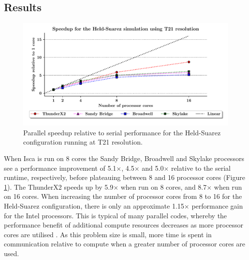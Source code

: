 \documentclass[a4paper,11pt]{report}
\begin{document}
\subsection{Results}
\begin{figure}[htbp]
\begin{center}
\includegraphics[width=1\textwidth]{img/speedup-T21-Held_suarez.pdf}
\caption[Speedup of the Held-Suarez configuration at T21 resolution]{Parallel speedup relative to serial performance for the Held-Suarez configuration running at T21 resolution.}
\label{fig:t21-scale}
\end{center}
\end{figure}
\par
When Isca is run on 8 cores the Sandy Bridge, Broadwell and Skylake processors see a performance improvement of  5.1$\times$, 4.5$\times$ and 5.0$\times$ relative to the serial runtime, respectively, before plateauing between 8 and 16 processor cores (Figure \ref{fig:t21-scale}). The ThunderX2 speeds up by 5.9$\times$ when run on 8 cores, and 8.7$\times$ when run on 16 cores. When increasing the number of processor cores from 8 to 16 for the Held-Suarez configuration, there is only an approximate 1.15$\times$ performance gain for the Intel processors. This is typical of many parallel codes, whereby the performance benefit of additional compute resources decreases as more processor cores are utilised \cite{asanovic2006landscape}. As this problem size is small, more time is spent in communication relative to compute when a greater number of processor cores are used. 
\par
\end{document}
